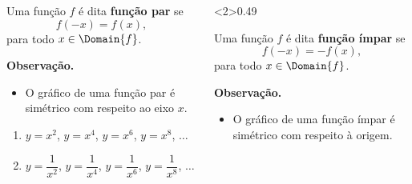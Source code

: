 \begin{frame}
  \begin{columns}[onlytextwidth]
    \begin{column}{0.49\textwidth}\vspace*{-0.5cm}
      \begin{definition}
        Uma função $f$ é dita \textbf{função par} se
        \begin{equation*}
          f(-x) = f(x),
        \end{equation*}
        para todo $x\in\Domain{f}$.
      \end{definition}
      \begin{highlight}
        \textbf{Observação.}
        \begin{itemize}
          \item O gráfico de uma função par é simétrico com respeito ao eixo $x$.
        \end{itemize}
      \end{highlight}
      \vspace*{0.2cm}
      \begin{example-highlight}
        \begin{enumerate}
          \item $y=x^{2}$, $y=x^{4}$, $y=x^{6}$, $y=x^{8}$, $\dots$
          \item $y=\dfrac{1}{x^{2}}$, $y=\dfrac{1}{x^{4}}$, $y=\dfrac{1}{x^{6}}$, $y=\dfrac{1}{x^{8}}$, $\dots$
        \end{enumerate}
      \end{example-highlight}
    \end{column}
    \begin{column}<2>{0.49\textwidth}\vspace*{-0.5cm}
      \begin{definition}
        Uma função $f$ é dita \textbf{função ímpar} se
        \begin{equation*}
          f(-x) = -f(x),
        \end{equation*}
        para todo $x\in\Domain{f}$.
      \end{definition}
      \begin{highlight}
        \textbf{Observação.}
        \begin{itemize}
          \item O gráfico de uma função ímpar é simétrico com respeito à origem.
        \end{itemize}
      \end{highlight}

\end{column}
\end{columns}
\end{frame}
